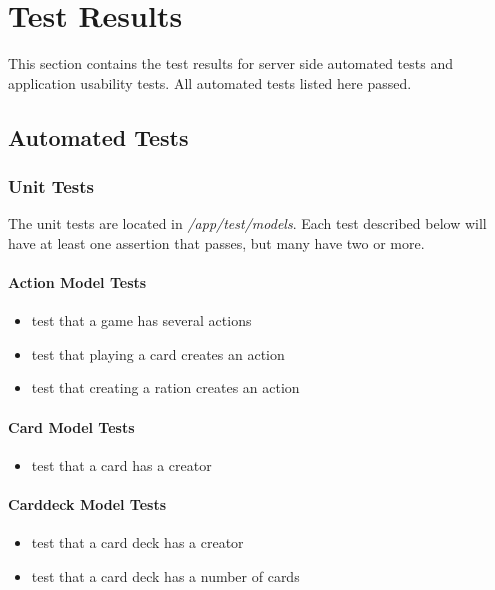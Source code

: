 \chapter{Test Results}
This section contains the test results for server side automated tests and application usability tests. All automated tests listed here passed.

\section{Automated Tests}
  \subsection{Unit Tests}
The unit tests are located in \textit{/app/test/models}. Each test described below will have at least one assertion that passes, but many have two or more.
\subsubsection{Action Model Tests}
\begin{itemize}
	\item test that a game has several actions
	\item test that playing a card creates an action
	\item test that creating a ration creates an action
\end{itemize}

\subsubsection{Card Model Tests}
\begin{itemize}
	\item test that a card has a creator
\end{itemize}

\subsubsection{Carddeck Model Tests}
\begin{itemize}
	\item test that a card deck has a creator
	\item test that a card deck has a number of cards
\end{itemize}

